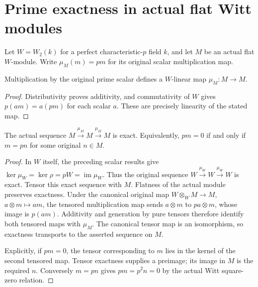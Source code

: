 \section{Prime exactness in actual flat Witt modules}
\label{sec:witt-two-flat-modules}

Let $W=W_2(k)$ for a perfect characteristic-$p$
field $k$, and let $M$ be an actual flat $W$-module.
Write $\mu_M(m)=pm$ for its original scalar
multiplication map.

\begin{definition}
\label{def:witt-two-module-prime}
\leanok
{}
Multiplication by the original prime scalar defines
a $W$-linear map $\mu_M:M\to M$.
\end{definition}
\begin{proof}
Distributivity proves additivity, and commutativity
of $W$ gives $p(am)=a(pm)$ for each scalar $a$.
These are precisely linearity of the stated map.
\end{proof}

\begin{theorem}
\label{thm:witt-two-flat-prime-exact}
\leanok
{}
The actual sequence $M\xrightarrow{\mu_M}M
\xrightarrow{\mu_M}M$ is exact. Equivalently,
$pm=0$ if and only if $m=pn$ for some original
$n\in M$.
\end{theorem}
\begin{proof}
In $W$ itself, the preceding scalar results give
$\ker\mu_W=\ker\rho=pW=\operatorname{im}\mu_W$.
Thus the original sequence $W\xrightarrow{\mu_W}W
\xrightarrow{\mu_W}W$ is exact. Tensor this exact
sequence with $M$. Flatness of the actual module
preserves exactness. Under the canonical original
map $W\otimes_W M\to M$, $a\otimes m\mapsto am$,
the tensored multiplication map sends $a\otimes m$
to $pa\otimes m$, whose image is $p(am)$.
Additivity and generation by pure tensors therefore
identify both tensored maps with $\mu_M$. The
canonical tensor map is an isomorphism, so exactness
transports to the asserted sequence on $M$.

Explicitly, if $pm=0$, the tensor corresponding to
$m$ lies in the kernel of the second tensored map.
Tensor exactness supplies a preimage; its image in
$M$ is the required $n$. Conversely $m=pn$ gives
$pm=p^2n=0$ by the actual Witt square-zero relation.
\end{proof}

